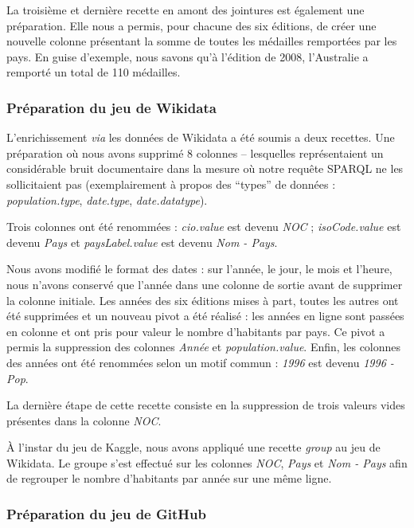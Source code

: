 \documentclass[hidelinks, 12pt]{article}
\begin{document}
La troisième et dernière recette en amont des jointures est également une préparation. Elle nous a permis, pour chacune des six éditions, de créer une nouvelle colonne présentant la somme de toutes les médailles remportées par les pays. En guise d'exemple, nous savons qu'à l'édition de 2008, l'Australie a remporté un total de 110 médailles.

\subsubsection{Préparation du jeu de Wikidata}

L'enrichissement \emph{via} les données de Wikidata a été soumis a deux recettes. Une préparation où nous avons supprimé 8 colonnes -- lesquelles représentaient un considérable bruit documentaire dans la mesure où notre requête SPARQL ne les sollicitaient pas (exemplairement à propos des \enquote{types} de données : \emph{population.type}, \emph{date.type}, \emph{date.datatype}). 

Trois colonnes ont été renommées : \emph{cio.value} est devenu \emph{NOC} ; \emph{isoCode.value} est devenu \emph{Pays} et \emph{paysLabel.value} est devenu \emph{Nom - Pays}.

Nous avons modifié le format des dates : sur l'année, le jour, le mois et l'heure, nous n'avons conservé que l'année dans une colonne de sortie avant de supprimer la colonne initiale. Les années des six éditions mises à part, toutes les autres ont été supprimées et un nouveau pivot a été réalisé : les années en ligne sont passées en colonne et ont pris pour valeur le nombre d'habitants par pays. Ce pivot a permis la suppression des colonnes \emph{Année} et \emph{population.value}. Enfin, les colonnes des années ont été renommées selon un motif commun : \emph{1996} est devenu \emph{1996 - Pop}.

La dernière étape de cette recette consiste en la suppression de trois valeurs vides présentes dans la colonne \emph{NOC}.

À l'instar du jeu de Kaggle, nous avons appliqué une recette \emph{group} au jeu de Wikidata. Le groupe s'est effectué sur les colonnes \emph{NOC}, \emph{Pays} et \emph{Nom - Pays} afin de regrouper le nombre d'habitants par année sur une même ligne.

\subsubsection{Préparation du jeu de GitHub}
\end{document}

